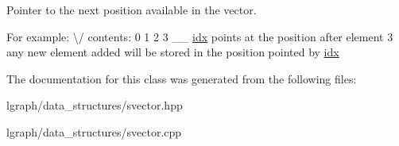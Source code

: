 Pointer to the next position available in the vector. 

For example\+: \textbackslash{}/ contents\+: 0 1 2 3 \+\_\+\+\_\+ \hyperlink{classlgraph_1_1utils_1_1svector_a7ef963c079c7dc8a6a559ceef81a241f}{idx} points at the position after element 3 any new element added will be stored in the position pointed by \hyperlink{classlgraph_1_1utils_1_1svector_a7ef963c079c7dc8a6a559ceef81a241f}{idx} 

The documentation for this class was generated from the following files\+:\begin{DoxyCompactItemize}
\item 
lgraph/data\+\_\+structures/svector.\+hpp\item 
lgraph/data\+\_\+structures/svector.\+cpp\end{DoxyCompactItemize}
